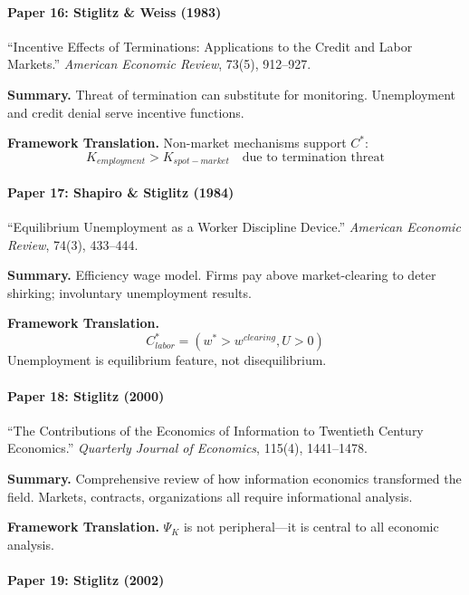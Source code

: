 \paragraph{Paper 16: Stiglitz \& Weiss (1983)}

``Incentive Effects of Terminations: Applications to the Credit and Labor Markets.''
\textit{American Economic Review}, 73(5), 912--927.

\textbf{Summary.}
Threat of termination can substitute for monitoring. Unemployment and 
credit denial serve incentive functions.

\textbf{Framework Translation.}
Non-market mechanisms support $C^*$:
\begin{equation}
K_{employment} > K_{spot-market} \quad \text{due to termination threat}
\end{equation}

\paragraph{Paper 17: Shapiro \& Stiglitz (1984)}

``Equilibrium Unemployment as a Worker Discipline Device.''
\textit{American Economic Review}, 74(3), 433--444.

\textbf{Summary.}
Efficiency wage model. Firms pay above market-clearing to deter shirking; 
involuntary unemployment results.

\textbf{Framework Translation.}
\begin{equation}
C^*_{labor} = (w^* > w^{clearing}, U > 0)
\end{equation}
Unemployment is equilibrium feature, not disequilibrium.

\paragraph{Paper 18: Stiglitz (2000)}

``The Contributions of the Economics of Information to Twentieth Century Economics.''
\textit{Quarterly Journal of Economics}, 115(4), 1441--1478.

\textbf{Summary.}
Comprehensive review of how information economics transformed the field. 
Markets, contracts, organizations all require informational analysis.

\textbf{Framework Translation.}
$\Psi_K$ is not peripheral—it is central to all economic analysis.

\paragraph{Paper 19: Stiglitz (2002)}

